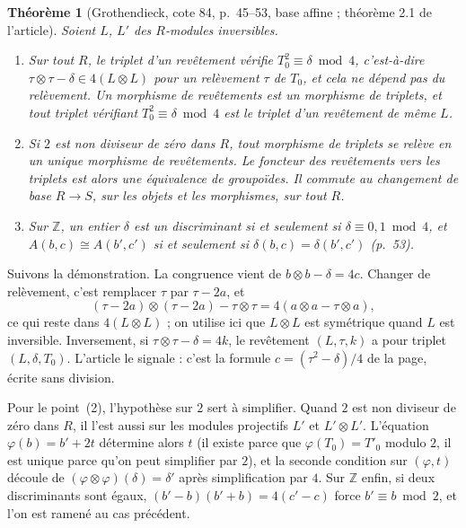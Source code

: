 \documentclass[11pt,a4paper]{amsart}
\theoremstyle{definition}
\theoremstyle{plain}
\newtheorem{theoreme}{Théorème}
\theoremstyle{remark}
\theoremstyle{plain}
\newcommand{\Z}{\mathbb Z}
\begin{document}
\begin{theoreme}[Grothendieck, cote 84, p.~45--53, base affine ; théorème 2.1 de l'article]
Soient $L$, $L'$ des $R$-modules inversibles.
\begin{enumerate}
\item Sur tout $R$, le triplet d'un revêtement vérifie $T_0^2 \equiv \delta \bmod 4$, c'est-à-dire $\tau\otimes\tau - \delta \in 4(L\otimes L)$ pour un relèvement $\tau$ de $T_0$, et cela ne dépend pas du relèvement. Un morphisme de revêtements est un morphisme de triplets, et tout triplet vérifiant $T_0^2 \equiv \delta \bmod 4$ est le triplet d'un revêtement de même $L$.
\item Si $2$ est non diviseur de zéro dans $R$, tout morphisme de triplets se relève en un unique morphisme de revêtements. Le foncteur des revêtements vers les triplets est alors une équivalence de groupoïdes. Il commute au changement de base $R \to S$, sur les objets et les morphismes, sur tout $R$.
\item Sur $\Z$, un entier $\delta$ est un discriminant si et seulement si $\delta \equiv 0, 1 \bmod 4$, et $A(b, c) \cong A(b', c')$ si et seulement si $\delta(b, c) = \delta(b', c')$ (p.~53).
\end{enumerate}
\end{theoreme}

Suivons la démonstration. La congruence vient de $b \otimes b - \delta = 4c$. Changer de relèvement, c'est remplacer $\tau$ par $\tau - 2a$, et
\[
(\tau - 2a)\otimes(\tau - 2a) - \tau\otimes\tau = 4(a\otimes a - \tau\otimes a),
\]
ce qui reste dans $4(L\otimes L)$ ; on utilise ici que $L\otimes L$ est symétrique quand $L$ est inversible. Inversement, si $\tau\otimes\tau - \delta = 4k$, le revêtement $(L, \tau, k)$ a pour triplet $(L, \delta, T_0)$. L'article le signale : c'est la formule $c = (\tau^2 - \delta)/4$ de la page, écrite sans division.

Pour le point~(2), l'hypothèse sur $2$ sert à simplifier. Quand $2$ est non diviseur de zéro dans $R$, il l'est aussi sur les modules projectifs $L'$ et $L'\otimes L'$. L'équation $\varphi(b) = b' + 2t$ détermine alors $t$ (il existe parce que $\varphi(T_0) = T'_0$ modulo $2$, il est unique parce qu'on peut simplifier par $2$), et la seconde condition sur $(\varphi, t)$ découle de $(\varphi\otimes\varphi)(\delta) = \delta'$ après simplification par $4$. Sur $\Z$ enfin, si deux discriminants sont égaux, $(b' - b)(b' + b) = 4(c' - c)$ force $b' \equiv b \bmod 2$, et l'on est ramené au cas précédent.
\end{document}
